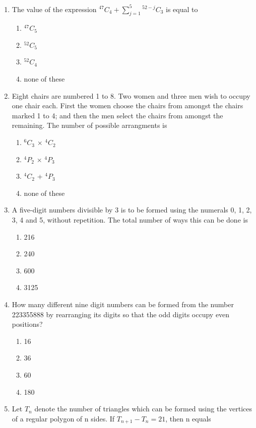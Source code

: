 \documentclass[journal,12pt,twocolumn]{IEEEtran}
\newcommand*{\Perm}[2]{{}^{#1}\!P_{#2}}%
\newcommand*{\Comb}[2]{{}^{#1}C_{#2}}%
\begin{document}
\begin{enumerate}
\begin{enumerate}
\end{enumerate}
\item The value of the expression $\Comb{47}{4}+\sum_{j=1}^{5} \Comb{52-j}{3}$ is equal to
\begin{enumerate}
\item $\Comb{47}{5}$
\item $\Comb{52}{5}$
\item $\Comb{52}{4}$
\item none of these\\
\end{enumerate} 
\item Eight chairs are numbered 1 to 8. Two women and three men wish to occupy one chair each. First the women choose the chairs from amongst the chairs marked 1 to 4; and then the men select the chairs from amongst the remaining. The number of possible arrangments is
\begin{enumerate}
\item $\Comb{6}{3}$ $\times$ $\Comb{4}{2}$
\item $\Perm{4}{2}$ $\times$ $\Perm{4}{3}$
\item $\Comb{4}{2}$ + $\Perm{4}{3}$
\item none of these\\
\end{enumerate}
\item A five-digit numbers divisible by 3 is to be formed using the numerals 0, 1, 2, 3, 4 and 5, without repetition. The total number of ways this can be done is
\begin{enumerate}
\item 216
\item 240
\item 600
\item 3125\\
\end{enumerate}
\item How many different nine digit numbers can be formed from the number 223355888 by rearranging its digits so that the odd digits occupy even positions?
\begin{enumerate}
\item 16
\item 36
\item 60
\item 180\\
\end{enumerate}
\item Let $T_n$ denote the number of triangles which can be formed using the vertices of a regular polygon of n sides. If $T_{n+1}-T_n = 21$, then n equals

\end{enumerate}
\end{document}
